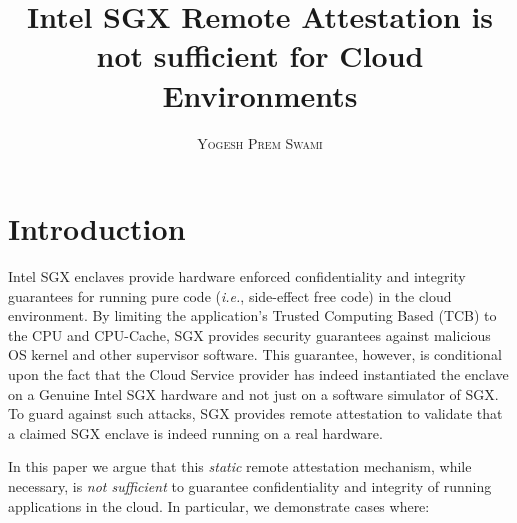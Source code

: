 \documentclass[11pt]{article}
\title{\bf Intel SGX Remote Attestation is not sufficient for Cloud Environments}
\author{\textsc{Yogesh Prem Swami}}
\date{\lastupdate}
\begin{document}

\maketitle

\section{Introduction}
    Intel SGX enclaves provide hardware enforced confidentiality and
    integrity guarantees for running pure code (\textit{i.e.},
    side-effect free code) in the cloud environment. By limiting the
    application's Trusted Computing Based (TCB) to the CPU and
    CPU-Cache, SGX provides security guarantees against malicious OS
    kernel and other supervisor software. This guarantee, however, is
    conditional upon the fact that the Cloud Service provider has
    indeed instantiated the enclave on a Genuine Intel SGX hardware
    and not just on a software simulator of SGX. To guard against such
    attacks, SGX provides remote attestation to validate that a
    claimed SGX enclave is indeed running on a real hardware.

    In this paper we argue that this \textit{static} remote
    attestation mechanism, while necessary, is \textit{not sufficient}
    to guarantee confidentiality and integrity of running applications
    in the cloud. In particular, we demonstrate cases where:
\end{document}

